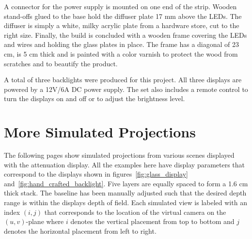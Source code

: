 A connector for the power supply is mounted on one end of the strip.
Wooden stand-offs glued to the base hold the diffuser plate 17 mm above the LEDs.
The diffuser is simply a white, milky acrylic plate from a hardware store, cut to the right size.
Finally, the build is concluded with a wooden frame covering the LEDs and wires and holding the glass plates in place.
The frame has a diagonal of 23 cm, is 5 cm thick and is painted with a color varnish to protect the wood from scratches and to beautify the product.

A total of three backlights were produced for this project.
All three displays are powered by a 12V/6A DC power supply.
The set also includes a remote control to turn the displays on and off or to adjust the brightness level.

\section{More Simulated Projections}
\label{sec:simulated_projections}

The following pages show simulated projections from various scenes displayed with the attenuation display.
All the examples here have display parameters that correspond to the displays shown in figures~\ref{fig:glass_display} and~\ref{fig:hand_crafted_backlight}.
Five layers are equally spaced to form a 1.6 cm thick stack.
The baseline has been manually adjusted such that the desired depth range is within the displays depth of field.
Each simulated view is labeled with an index $(i, j)$ that corresponds to the location of the virtual camera on the \mbox{$(u, v)$-plane} where $i$ denotes the vertical placement from top to bottom and $j$ denotes the horizontal placement from left to right.

